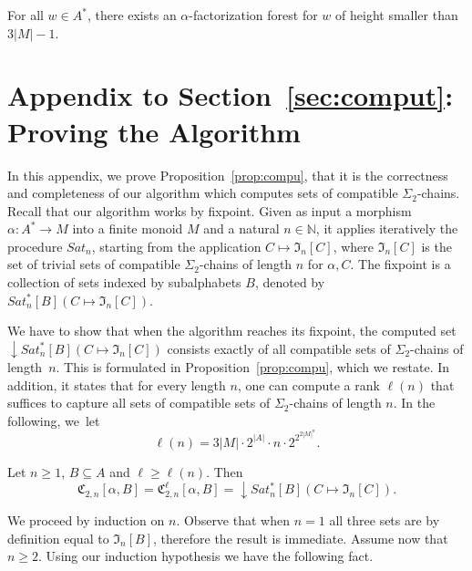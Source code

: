 \documentclass[envcountsame]{llncs}
\newcounter{sauvegarde}
\newcommand\adjustc[1]{\protect{\setcounter{sauvegarde}{\thetheorem}
  \setcounterref{theorem}{#1}
  \addtocounter{theorem}{-1}
}}
\newcommand\restorec{
\setcounter{theorem}{\thesauvegarde}
}
\newcommand\nat{\ensuremath{\mathbb{N}}\xspace}
\newcommand\fCgen[3]{\ensuremath{\fC_{#1,#3}^{#2}}\xspace}
\newcommand\fCtwon{\ensuremath{\fC_{2,n}}\xspace}
\newcommand{\sic}[1]{\ensuremath{\Sigma_{#1}}\xspace}
\newcommand\gmo{\ensuremath{\geqslant}\xspace}
\let\geq\geqslant
\newcommand\qchains[1]{\ensuremath{\sic{#1}}-chains\xspace}
\newcommand\dchains{\qchains{2}}
\newcommand\fI{\ensuremath{\mathfrak I}\xspace}
\newcommand\fC{\ensuremath{\mathfrak C}\xspace}
\DeclareMathOperator{\downclos}{\downarrow}
\begin{document}
\begin{theorem} \label{thm:facto}
  For all $w \in A^*$, there exists an $\alpha$-factorization forest for
  $w$ of height smaller than $3|M|-1$.
\end{theorem}












\section{Appendix to Section~\ref{sec:comput}: Proving the Algorithm}
\label{app:algo}
In this appendix, we prove Proposition~\ref{prop:compu}, that it is
the correctness and completeness of our algorithm which computes sets
of compatible \dchains. Recall that our algorithm works by
fixpoint. Given as input a morphism $\alpha: A^* \rightarrow M$ into a
finite monoid $M$ and a natural $n \in \nat$, it applies iteratively
the procedure $Sat_n$, starting from the application $C \mapsto
\fI_n[C]$, where $\fI_n[C]$ is the set of trivial sets of compatible
\dchains of length $n$ for $\alpha,C$. The fixpoint is a collection of
sets indexed by subalphabets $B$, denoted by $Sat^{*}_n[B](C \mapsto
\fI_n[C])$. 

We have to show that when the algorithm reaches its fixpoint, the
computed set $\downclos Sat^{*}_n[B](C \mapsto \fI_n[C])$ consists
exactly of all compatible sets of \dchains of length~$n$. This is
formulated in Proposition~\ref{prop:compu}, which we restate. In
addition, it states that for every length $n$, one can compute a rank
$\ell(n)$ that suffices to capture all sets of compatible sets of
\dchains of length $n$. In the following, we~let
\[\ell(n)= 3|M| \cdot 2^{|A|}\cdot n\cdot 2^{2^{2|M|^n}}.\]

\adjustc{prop:compu}
\begin{proposition}
  Let $n \gmo 1$, $B \subseteq A$ and $\ell\geq\ell(n)$. Then $$\fCtwon[\alpha,B] = 
  \fCgen{2}{\ell}{n}[\alpha,B] = \downclos Sat^{*}_n[B](C \mapsto \fI_n[C]).$$
\end{proposition}
\restorec

We proceed by induction on $n$. Observe that when $n = 1$ all three
sets are by definition equal to $\fI_n[B]$, therefore the result is
immediate. Assume now that $n \geq 2$. Using our induction hypothesis
we have the following fact.
\end{document}
